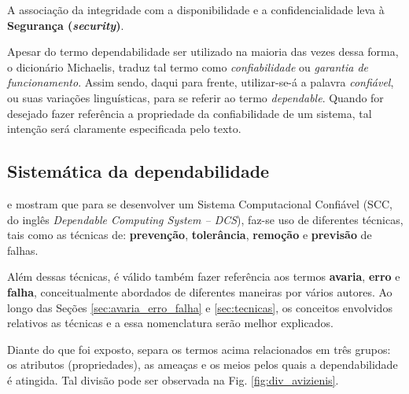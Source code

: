 A associação da integridade com a disponibilidade e a confidencialidade leva à
\textbf{Segurança (\textit{security})}.

Apesar do termo dependabilidade ser utilizado na maioria das vezes dessa forma,
o dicionário Michaelis, traduz tal termo como {\it confiabilidade} ou {\it
garantia de funcionamento}. Assim sendo, daqui para frente, utilizar-se-á a
palavra {\it confiável}, ou suas variações linguísticas, para se referir ao
termo {\it dependable}. Quando for desejado fazer referência a propriedade da
confiabilidade de um sistema, tal intenção será claramente especificada pelo
texto.

\subsection{Sistemática da dependabilidade}
 e  mostram que para se
desenvolver um Sistema Computacional Confiável (SCC, do inglês {\it Dependable
Computing System -- DCS}), faz-se uso de diferentes técnicas, tais como as
técnicas de: {\bf prevenção}, {\bf tolerância}, {\bf remoção} e {\bf previsão}
de falhas.

Além dessas técnicas, é válido também fazer referência aos termos {\bf avaria},
{\bf erro} e {\bf falha}, conceitualmente abordados de diferentes maneiras por
vários autores. Ao longo das Seções \ref{sec:avaria_erro_falha} e
\ref{sec:tecnicas}, os conceitos envolvidos relativos as técnicas e a essa
nomenclatura serão melhor explicados.

\begin{comment}
\begin{itemize}
    \item {\bf Técnicas de prevenção:} Como prevenir a ocorrência ou a introdução de
          falhas;
    \item {\bf Técnicas de tolerância:} Como oferecer um serviço ``correto'' na
          presença de falhas;
    \item {\bf Técnicas de remoção:} Como reduzir o número ou atenuar a gravidade
          das falhas;
    \item {\bf Técnicas de previsão:} Como estimar o número atual, a incidência
          futura e as consequências das prováveis falhas.
\end{itemize}
\end{comment}

Diante do que foi exposto,  separa os termos acima
relacionados em três grupos: os atributos (propriedades), as ameaças e os meios
pelos quais a dependabilidade é atingida. Tal divisão pode ser observada na Fig.
\ref{fig:div_avizienis}.


